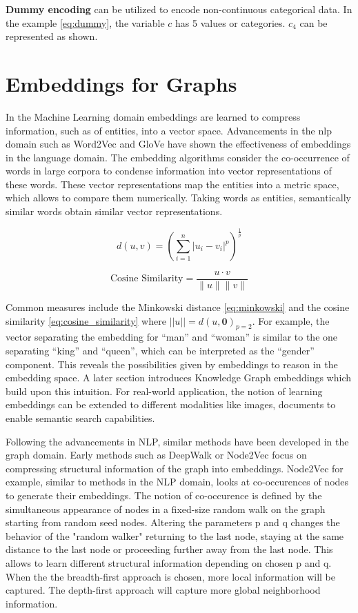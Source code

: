 \textbf{Dummy encoding} can be utilized to encode non-continuous categorical data. In the example  \eqref{eq:dummy}, the variable $c$ has 5 values or categories. $c_4$ can be represented as shown. 

\section{Embeddings for Graphs}
In the Machine Learning domain embeddings are learned to compress information, such as of entities, into a vector space. Advancements in the \ac{nlp} domain such as Word2Vec \parencite{mikolov2013efficient} and GloVe \parencite{pennington2014glove} have shown the effectiveness of embeddings in the language domain. The embedding algorithms consider the co-occurrence of words in large corpora to condense information into vector representations of these words. These vector representations map the entities into a metric space, which allows to compare them numerically. Taking words as entities, semantically similar words obtain similar vector representations. 

\begin{equation}\label{eq:minkowski}
    d(u, v) = \left( \sum_{i=1}^{n} |u_i - v_i|^p \right)^{\frac{1}{p}}
\end{equation}

\begin{equation}\label{eq:cosine_similarity}
    \text{Cosine Similarity} = \frac{{u \cdot v}}{{\|u\| \|v\|}}
\end{equation}

Common measures include the Minkowski distance \eqref{eq:minkowski} and the cosine similarity \eqref{eq:cosine_similarity} where $||u|| = d(u,\mathbf{0})_{p=2}$. For example, the vector separating the embedding for “man” and “woman” is similar to the one separating “king” and “queen”, which can be interpreted as the “gender” component. This reveals the possibilities given by embeddings to reason in the embedding space. A later section introduces Knowledge Graph embeddings which build upon this intuition. For real-world application, the notion of learning embeddings can be extended to different modalities like images, documents to enable semantic search capabilities. 

Following the advancements in NLP, similar methods have been developed in the graph domain. Early methods such as DeepWalk \parencite{perozzi2014deepwalk} or Node2Vec \parencite{grover2016node2vec} focus on compressing structural information of the graph into embeddings. Node2Vec for example, similar to methods in the NLP domain, looks at co-occurences of nodes to generate their embeddings. The notion of co-occurence is defined by the simultaneous appearance of nodes in a fixed-size random walk on the graph starting from random seed nodes. Altering the parameters p and q changes the behavior of the "random walker" returning to the last node, staying at the same distance to the last node or proceeding further away from the last node. This allows to learn different structural information depending on chosen p and q. When the the breadth-first approach is chosen, more local information will be captured. The depth-first approach will capture more global neighborhood information.

